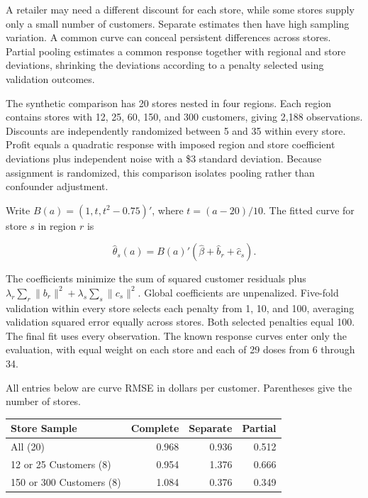\noindent \noindent A retailer may need a different discount for each store, while
some stores supply only a small number of customers. Separate estimates
then have high sampling variation. A common curve can conceal persistent
differences across stores. Partial pooling estimates a common response
together with regional and store deviations, shrinking the deviations
according to a penalty selected using validation outcomes.

The synthetic comparison has 20 stores nested in four regions. Each
region contains stores with 12, 25, 60, 150, and 300 customers, giving
2,188 observations. Discounts are independently randomized between 5 and
35 within every store. Profit equals a quadratic response with imposed
region and store coefficient deviations plus independent noise with a
\$3 standard deviation. Because assignment is randomized, this
comparison isolates pooling rather than confounder adjustment.

Write \(B(a)=(1,t,t^2-0.75)'\), where \(t=(a-20)/10\). The fitted curve
for store \(s\) in region \(r\) is

\[
\widehat\theta_s(a)=B(a)'(\widehat\beta+\widehat b_r+\widehat c_s).
\]

The coefficients minimize the sum of squared customer residuals plus
\(\lambda_r\sum_r\|b_r\|^2+\lambda_s\sum_s\|c_s\|^2\). Global
coefficients are unpenalized. Five-fold validation within every store
selects each penalty from 1, 10, and 100, averaging validation squared
error equally across stores. Both selected penalties equal 100. The
final fit uses every observation. The known response curves enter only
the evaluation, with equal weight on each store and each of 29 doses
from 6 through 34.

All entries below are curve RMSE in dollars per customer. Parentheses
give the number of stores.

\begin{table}[H]
\centering\small
\begin{tabular}{@{}lrrr@{}}
\toprule
Store Sample & Complete & Separate & Partial \\
\midrule

All (20) & 0.968 & 0.936 & 0.512 \\
12 or 25 Customers (8) & 0.954 & 1.376 & 0.666 \\
150 or 300 Customers (8) & 1.084 & 0.376 & 0.349 \\
\bottomrule
\end{tabular}
\end{table}

